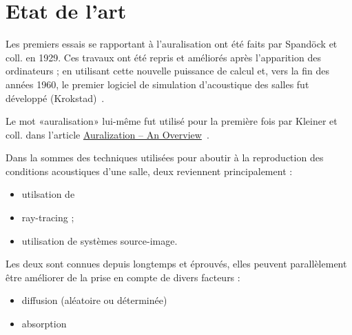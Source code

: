 \section{Etat de l'art}

Les premiers essais se rapportant à l'auralisation ont été faits par Spandöck et coll. en 1929.
Ces travaux ont été repris et améliorés après l'apparition des ordinateurs ; en utilisant cette nouvelle puissance de
calcul et, vers la fin des années 1960, le premier logiciel de simulation d'acoustique des salles fut développé
(Krokstad)~\cite{Vor08}.

Le mot «auralisation» lui-même fut utilisé pour la première fois par Kleiner et coll. dans l'article
\underline{Auralization -- An Overview}~\cite{Kle93}.

Dans la sommes des techniques utilisées pour aboutir à la reproduction des conditions acoustiques d'une salle, deux
reviennent principalement :

\begin{itemize}
    \item utilsation de \item{ray-tracing} ;
    \item utilisation de systèmes source-image.
\end{itemize}

Les deux sont connues depuis longtemps et éprouvés, elles peuvent parallèlement être améliorer de la prise en compte de
divers facteurs :

\begin{itemize}
    \item diffusion (aléatoire ou déterminée)
    \item absorption
\end{itemize}

